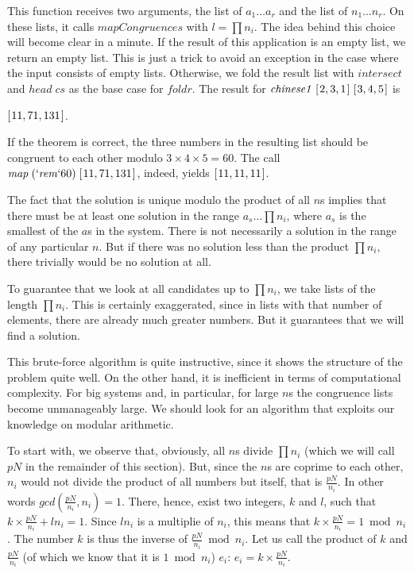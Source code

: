 \documentclass{scrreprt}
\newcommand{\Varid}[1]{\mathit{#1}}
\begin{document}
This function receives two arguments,
the list of $a_1\dots a_r$ and the list of $n_1\dots n_r$.
On these lists, it calls \ensuremath{\Varid{mapCongruences}}
with $l = \prod{n_i}$.
The idea behind this choice will become clear in a minute.
If the result of this application is an empty list,
we return an empty list.
This is just a trick to avoid an exception
in the case where the input consists of empty lists.
Otherwise, we fold the result list with \ensuremath{\Varid{intersect}}
and \ensuremath{\Varid{head}\;\Varid{cs}} as the base case for \ensuremath{\Varid{foldr}}.
The result for \ensuremath{\Varid{chinese1}\;[\mskip1.5mu \mathrm{2},\mathrm{3},\mathrm{1}\mskip1.5mu]\;[\mskip1.5mu \mathrm{3},\mathrm{4},\mathrm{5}\mskip1.5mu]} is

\ensuremath{[\mskip1.5mu \mathrm{11},\mathrm{71},\mathrm{131}\mskip1.5mu]}.

If the theorem is correct, the three numbers
in the resulting list should be congruent to each other modulo 
$3 \times 4 \times 5=60$.
The call \ensuremath{\Varid{map}\;(\mathbin{\Varid{`rem`}}\mathrm{60})\;[\mskip1.5mu \mathrm{11},\mathrm{71},\mathrm{131}\mskip1.5mu]}, indeed, yields \ensuremath{[\mskip1.5mu \mathrm{11},\mathrm{11},\mathrm{11}\mskip1.5mu]}.

The fact that the solution is unique 
modulo the product of all $n$s implies
that there must be at least one solution
in the range $a_s \dots \prod{n_i}$,
where $a_s$ is the smallest of the $a$s in the system.
There is not necessarily a solution in the range
of any particular $n$. But if there was no solution
less than the product $\prod{n_i}$,
there trivially would be no solution at all.

To guarantee that we look at all candidates
up to $\prod{n_i}$, we take lists 
of the length $\prod{n_i}$. This is certainly
exaggerated, since in lists with that number
of elements, there are already much greater numbers.
But it guarantees that we will find a solution.

This brute-force algorithm is quite instructive,
since it shows the structure of the problem
quite well. On the other hand, 
it is inefficient in terms of computational complexity.
For big systems and, in particular, for large $n$s
the congruence lists become unmanageably large.
We should look for an algorithm
that exploits our knowledge on modular arithmetic.

To start with, we observe that, obviously,
all $n$s divide $\prod{n_i}$
(which we will call $pN$ in the remainder of this section).
But, since the $n$s are coprime to each other, $n_i$ would
not divide the product of all numbers but itself,
that is $\frac{pN}{n_i}$. In other words 
$gcd(\frac{pN}{n_i}, n_i) = 1$.
There, hence, exist two integers, $k$ and $l$,
such that $k \times \frac{pN}{n_i} + ln_i = 1$.
Since $ln_i$ is a multiplie of $n_i$,
this means that 
$k \times \frac{pN}{n_i} = 1 \bmod n_i$.
The number $k$ is thus the inverse of $\frac{pN}{n_i} \bmod n_i$.
Let us call the product of $k$ and $\frac{pN}{n_i}$ 
(of which we know that it is $1 \bmod n_i$) $e_i$:
$e_i = k \times \frac{pN}{n_i}$.
\end{document}
